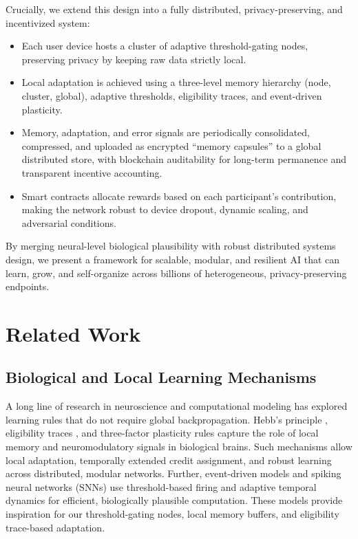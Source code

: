 \documentclass[11pt]{article}
\begin{document}
Crucially, we extend this design into a fully distributed, privacy-preserving, and incentivized system:
\begin{itemize}
    \item Each user device hosts a cluster of adaptive threshold-gating nodes, preserving privacy by keeping raw data strictly local.
    \item Local adaptation is achieved using a three-level memory hierarchy (node, cluster, global), adaptive thresholds, eligibility traces, and event-driven plasticity.
    \item Memory, adaptation, and error signals are periodically consolidated, compressed, and uploaded as encrypted “memory capsules” to a global distributed store, with blockchain auditability for long-term permanence and transparent incentive accounting.
    \item Smart contracts allocate rewards based on each participant’s contribution, making the network robust to device dropout, dynamic scaling, and adversarial conditions.
\end{itemize}

By merging neural-level biological plausibility with robust distributed systems design, we present a framework for scalable, modular, and resilient AI that can learn, grow, and self-organize across billions of heterogeneous, privacy-preserving endpoints.

\section{Related Work}

\subsection{Biological and Local Learning Mechanisms}
A long line of research in neuroscience and computational modeling has explored learning rules that do not require global backpropagation. Hebb’s principle \cite{Hebb1949}, eligibility traces \cite{Gerstner2018}, and three-factor plasticity rules capture the role of local memory and neuromodulatory signals in biological brains. Such mechanisms allow local adaptation, temporally extended credit assignment, and robust learning across distributed, modular networks. Further, event-driven models and spiking neural networks (SNNs) \cite{Izhikevich2004, Pozzorini2013, Fusi2005} use threshold-based firing and adaptive temporal dynamics for efficient, biologically plausible computation. These models provide inspiration for our threshold-gating nodes, local memory buffers, and eligibility trace-based adaptation.
\end{document}
